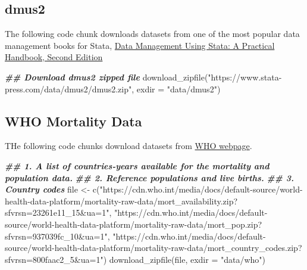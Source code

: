\documentclass[
]{book}
\newenvironment{Shaded}{\begin{snugshade}}{\end{snugshade}}
\newcommand{\AttributeTok}[1]{\textcolor[rgb]{0.77,0.63,0.00}{#1}}
\newcommand{\DocumentationTok}[1]{\textcolor[rgb]{0.56,0.35,0.01}{\textbf{\textit{#1}}}}
\newcommand{\FunctionTok}[1]{\textcolor[rgb]{0.00,0.00,0.00}{#1}}
\newcommand{\NormalTok}[1]{#1}
\newcommand{\OtherTok}[1]{\textcolor[rgb]{0.56,0.35,0.01}{#1}}
\newcommand{\StringTok}[1]{\textcolor[rgb]{0.31,0.60,0.02}{#1}}
\begin{document}
\hypertarget{dmus2}{%
\subsection{dmus2}\label{dmus2}}

The following code chunk downloads datasets from one of the most popular data management books for Stata, \href{https://www.stata-press.com/data/dmus2.html}{Data Management Using Stata: A Practical Handbook, Second Edition}

\begin{Shaded}
\begin{Highlighting}[]
\DocumentationTok{\#\# Download dmus2 zipped file}
\FunctionTok{download\_zipfile}\NormalTok{(}\StringTok{"https://www.stata{-}press.com/data/dmus2/dmus2.zip"}\NormalTok{, }
                 \AttributeTok{exdir =} \StringTok{"data/dmus2"}\NormalTok{)}
\end{Highlighting}
\end{Shaded}

\hypertarget{who-mortality-data}{%
\subsection{WHO Mortality Data}\label{who-mortality-data}}

THe following code chunks download datasets from \href{https://www.who.int/data/data-collection-tools/who-mortality-database}{WHO webpage}.

\begin{Shaded}
\begin{Highlighting}[]
\DocumentationTok{\#\# 1. A list of countries{-}years available for the mortality and population data.}
\DocumentationTok{\#\# 2. Reference populations and live births.}
\DocumentationTok{\#\# 3. Country codes}
\NormalTok{file }\OtherTok{\textless{}{-}} \FunctionTok{c}\NormalTok{(}\StringTok{"https://cdn.who.int/media/docs/default{-}source/world{-}health{-}data{-}platform/mortality{-}raw{-}data/mort\_availability.zip?sfvrsn=23261e11\_15\&ua=1"}\NormalTok{, }
          \StringTok{"https://cdn.who.int/media/docs/default{-}source/world{-}health{-}data{-}platform/mortality{-}raw{-}data/mort\_pop.zip?sfvrsn=937039fc\_10\&ua=1"}\NormalTok{, }
          \StringTok{"https://cdn.who.int/media/docs/default{-}source/world{-}health{-}data{-}platform/mortality{-}raw{-}data/mort\_country\_codes.zip?sfvrsn=800faac2\_5\&ua=1"}\NormalTok{)}
\FunctionTok{download\_zipfile}\NormalTok{(file, }\AttributeTok{exdir =} \StringTok{"data/who"}\NormalTok{)}
\end{Highlighting}
\end{Shaded}
\end{document}
